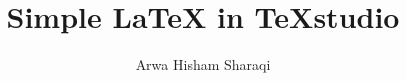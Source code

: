\documentclass[a4paper,12pt]{book}
\begin{document}
\author{Arwa Hisham Sharaqi}
\title{Simple LaTeX in TeXstudio}


\frontmatter
\maketitle
\tableofcontents

\mainmatter



\backmatter
\end{document}
